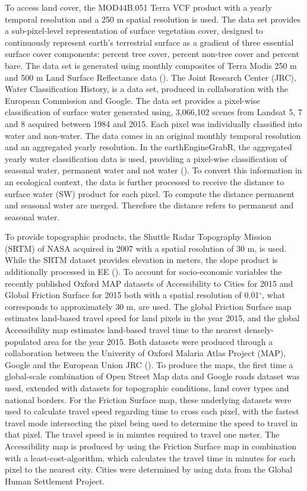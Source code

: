 To access land cover, the MOD44B.051 Terra VCF product with a yearly temporal resolution and a 250 m spatial resolution is used. The data set provides a sub-pixel-level representation of surface vegetation cover, designed to continuously represent earth's terrestrial surface as a gradient of three essential surface cover components: percent tree cover, percent non-tree cover and percent bare. The data set is generated using monthly composites of Terra Modis 250 m and 500 m Land Surface Reflectance data (\cite{hansen2006vegetation}).
The Joint Research Center (JRC), Water Classification History, is a data set, produced in collaboration with the European Commission and Google. The data set provides a pixel-wise classification of surface water generated using, 3,066,102 scenes from Landsat 5, 7 and 8 acquired between 1984 and 2015. Each pixel was individually classified into water and non-water. The data comes in an original monthly temporal resolution and an aggregated yearly resolution. In the earthEngineGrabR, the aggregated yearly water classification data is used, providing a pixel-wise classification of seasonal water, permanent water and not water (\cite{pekel2016high}). To convert this information in an ecological context, the data is further processed to receive the distance to surface water (SW) product for each pixel. To compute the distance permanent and seasonal water are merged. Therefore the distance refers to permanent and seasonal water.

To provide topographic products, the Shuttle Radar Topography Mission (SRTM) of NASA acquired in 2007 with a spatial resolution of 30 m, is used. While the SRTM dataset provides elevation in meters, the slope product is additionally processed in EE (\cite{farr2007shuttle}). To account for socio-economic variables the recently published Oxford MAP datasets of Accessibility to Cities for 2015 and Global Friction Surface for 2015 both with a spatial resolution of 0.01$^\circ$, what corresponds to approximately 30 m, are used. The global Friction Surface map estimates land-based travel speed for land pixels in the year 2015, and the global Accessibility map estimates land-based travel time to the nearest densely-populated area for the year 2015. Both datasets were produced through a collaboration between the Univerity of Oxford Malaria Atlas Project (MAP), Google and the European Union JRC (\cite{weiss2018global}). To produce the maps, the first time a global-scale combination of Open Street Map data and Google roads dataset was used, extended with datasets for topographic conditions, land cover types and national borders.
For the Friction Surface map, these underlying datasets were used to calculate travel speed regarding time to cross each pixel, with the fastest travel mode intersecting the pixel being used to determine the speed to travel in that pixel. The travel speed is in minutes required to travel one meter. The Accessibility map is produced by using the Friction Surface map in combination with a least-cost-algorithm, which calculates the travel time in minutes for each pixel to the nearest city. Cities were determined by using data from the Global Human Settlement Project.  

